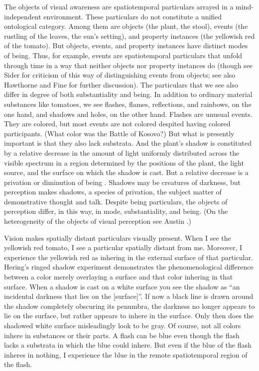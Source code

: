 \documentclass[12pt]{article}
\begin{document}
The objects of visual awareness are spatiotemporal particulars arrayed in a mind-independent environment. These particulars do not constitute a unified ontological category. Among them are objects (the plant, the stool), events (the rustling of the leaves, the sun's setting), and property instances (the yellowish red of the tomato). But objects, events, and property instances have distinct modes of being. Thus, for example, events are spatiotemporal particulars that unfold through time in a way that neither objects nor property instances do (though see Sider \citeyear{Sider:1997fk} for criticism of this way of distinguishing events from objects; see also Hawthorne \citeyear{Hawthorne:2008uq} and Fine \citeyear{Fine:2006fk} for further discussion). The particulars that we see also differ in degree of both substantiality and being. In addition to ordinary material substances like tomatoes, we see flashes, flames, reflections, and rainbows, on the one hand, and shadows and holes, on the other hand. Flashes are unusual events. They are colored, but most events are not colored despited having colored participants. (What color was the Battle of Kosovo?) But what is presently important is that they also lack substrata. And the plant's shadow is constituted by a relative decrease in the amount of light uniformly distributed across the visible spectrum in a region determined by the positions of the plant, the light source, and the surface on which the shadow is cast. But a relative decrease is a privation or diminution of being \citep[see][]{Sorensen:2008kx}. Shadows may be creatures of darkness, but perception makes shadows, a species of privation, the subject matter of demonstrative thought and talk. Despite being particulars, the objects of perception differ, in this way, in mode, substantiality, and being. (On the heterogeneity of the objects of visual perception see Austin \citeyear{Austin:1962lr}.)

Vision makes spatially distant particulars visually present. When I see the yellowish red tomato, I see a particular spatially distant from me. Moreover, I experience the yellowish red as inhering in the external surface of that particular. Hering's \citeyearpar[8]{Hering:1920ty} ringed shadow experiment demonstrates the phenomenological difference between a color merely overlaying a surface and that color inhering in that surface. When a shadow is cast on a white surface you see the shadow as ``an incidental darkness that lies on the [surface]''. If now a black line is drawn around the shadow completely obscuring its penumbra, the darkness no longer appears to lie on the surface, but rather appears to inhere in the surface. Only then does the shadowed white surface misleadingly look to be gray. Of course, not all colors inhere in substances or their parts. A flash can be blue even though the flash lacks a substrata in which the blue could inhere. But even if the blue of the flash inheres in nothing, I experience the blue in the remote spatiotemporal region of the flash. 
\end{document}
